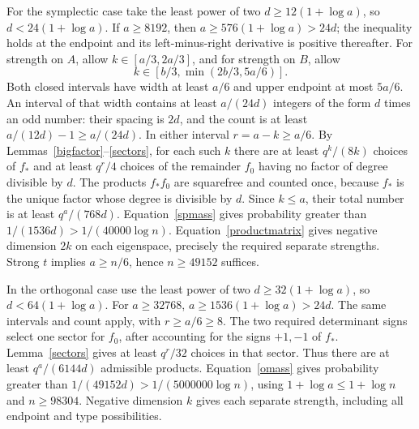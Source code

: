 \documentclass[11pt]{article}
\begin{document}
For the symplectic case take the least power of two $d\ge12(1+\log a)$, so $d<24(1+\log a)$. If $a\ge8192$, then $a\ge576(1+\log a)>24d$; the inequality holds at the endpoint and its left-minus-right derivative is positive thereafter. For strength on $A$, allow $k\in[a/3,2a/3]$, and for strength on $B$, allow
\begin{equation}\label{targetinterval}
k\in[b/3,\min(2b/3,5a/6)].
\end{equation}
Both closed intervals have width at least $a/6$ and upper endpoint at most $5a/6$. An interval of that width contains at least $a/(24d)$ integers of the form $d$ times an odd number: their spacing is $2d$, and the count is at least $a/(12d)-1\ge a/(24d)$. In either interval $r=a-k\ge a/6$. By Lemmas~\ref{bigfactor}--\ref{sectors}, for each such $k$ there are at least $q^k/(8k)$ choices of $f_*$ and at least $q^r/4$ choices of the remainder $f_0$ having no factor of degree divisible by $d$. The products $f_*f_0$ are squarefree and counted once, because $f_*$ is the unique factor whose degree is divisible by $d$. Since $k\le a$, their total number is at least $q^a/(768d)$. Equation~\eqref{spmass} gives probability greater than $1/(1536d)>1/(40000\log n)$. Equation~\eqref{productmatrix} gives negative dimension $2k$ on each eigenspace, precisely the required separate strengths. Strong $t$ implies $a\ge n/6$, hence $n\ge49152$ suffices.

In the orthogonal case use the least power of two $d\ge32(1+\log a)$, so $d<64(1+\log a)$. For $a\ge32768$, $a\ge1536(1+\log a)>24d$. The same intervals and count apply, with $r\ge a/6\ge8$. The two required determinant signs select one sector for $f_0$, after accounting for the signs $+1,-1$ of $f_*$. Lemma~\ref{sectors} gives at least $q^r/32$ choices in that sector. Thus there are at least $q^a/(6144d)$ admissible products. Equation~\eqref{omass} gives probability greater than $1/(49152d)>1/(5000000\log n)$, using $1+\log a\le1+\log n$ and $n\ge98304$. Negative dimension $k$ gives each separate strength, including all endpoint and type possibilities.
\end{document}
